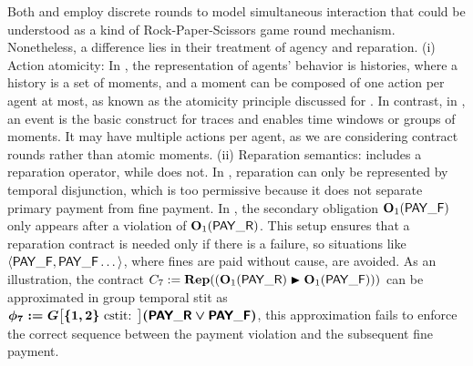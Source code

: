 Both \cDL and  employ discrete rounds to model simultaneous interaction that could be understood as a kind of Rock-Paper-Scissors game round mechanism. Nonetheless, a difference lies in their treatment of agency and reparation.
(i) Action atomicity: In , the representation of agents' behavior is histories, where a history is a set of moments, and a moment can be composed of one action per agent at most, as known as the atomicity principle discussed for \TDDLfm. In contrast, in \cDL, an event is the basic construct for traces and enables time windows or groups of moments. It may have multiple actions per agent, as we are considering contract rounds rather than atomic moments.
(ii) Reparation semantics: \cDL includes a reparation operator, while  does not. In , reparation can only be represented by temporal disjunction, which is too permissive because it does not separate primary payment from fine payment. In \cDL, the secondary obligation $\obl[1]{\PAYF}$ only appears after a violation of $\obl[1]{\PAY}$. This setup ensures that a reparation contract is needed only if there is a failure, so situations like $\langle \PAYF, \PAYF \dots \rangle$, where fines are paid without cause, are avoided.
As an illustration, the \cDL contract $C_7 := \repit{(\obl[1]{\PAY} \repair \obl[1]{\PAYF})}$ can be approximated in group temporal stit \cite{canavotto2022responsibility} as $\phi_7 := \boldmath{G}\big[ \{1,2\} \text{ cstit: }\big] (\PAY \lor \PAYF)$, this approximation fails to enforce the correct sequence between the payment violation and the subsequent fine payment.



